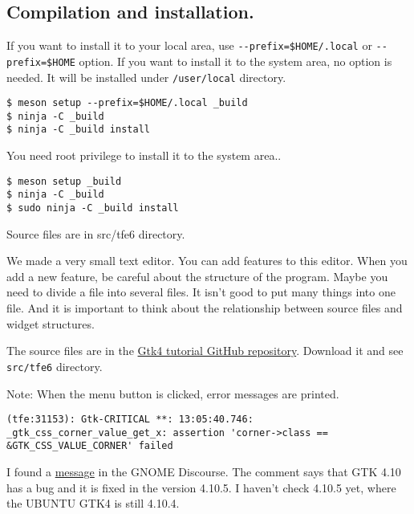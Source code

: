 \subsection{Compilation and
installation.}\label{compilation-and-installation.}

If you want to install it to your local area, use
\passthrough{\lstinline!--prefix=$HOME/.local!} or
\passthrough{\lstinline!--prefix=$HOME!} option. If you want to install
it to the system area, no option is needed. It will be installed under
\passthrough{\lstinline!/user/local!} directory.

\begin{lstlisting}
$ meson setup --prefix=$HOME/.local _build
$ ninja -C _build
$ ninja -C _build install
\end{lstlisting}

You need root privilege to install it to the system area..

\begin{lstlisting}
$ meson setup _build
$ ninja -C _build
$ sudo ninja -C _build install
\end{lstlisting}

Source files are in src/tfe6 directory.

We made a very small text editor. You can add features to this editor.
When you add a new feature, be careful about the structure of the
program. Maybe you need to divide a file into several files. It isn't
good to put many things into one file. And it is important to think
about the relationship between source files and widget structures.

The source files are in the
\href{https://github.com/ToshioCP/Gtk4-tutorial}{Gtk4 tutorial GitHub
repository}. Download it and see \passthrough{\lstinline!src/tfe6!}
directory.

Note: When the menu button is clicked, error messages are printed.

\begin{lstlisting}
(tfe:31153): Gtk-CRITICAL **: 13:05:40.746: _gtk_css_corner_value_get_x: assertion 'corner->class == &GTK_CSS_VALUE_CORNER' failed
\end{lstlisting}

I found a
\href{https://discourse.gnome.org/t/menu-button-gives-error-messages-with-latest-gtk4/15689}{message}
in the GNOME Discourse. The comment says that GTK 4.10 has a bug and it
is fixed in the version 4.10.5. I haven't check 4.10.5 yet, where the
UBUNTU GTK4 is still 4.10.4.
